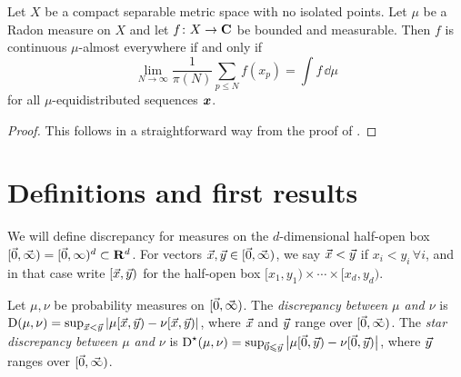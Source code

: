 \begin{theorem}
Let $X$ be a compact separable metric space with no isolated points. Let $\mu$ 
be a Radon measure on $X$ and let $f\colon X\to \mathbf{C}$ be bounded and measurable. 
Then $f$ is continuous $\mu$-almost everywhere if and only if 
\[
	\lim_{N\to \infty} \frac{1}{\pi(N)} \sum_{p\leqslant N} f(x_p) = \int f\, \dd\mu
\]
for all $\mu$-equidistributed sequences ${\boldsymbol x}$. 
\end{theorem}
\begin{proof}
This follows in a straightforward way from the proof of 
\cite[Th.~1]{mazzone-1995}. 
\end{proof}





\section{Definitions and first results}

We will define discrepancy for measures on the $d$-dimensional half-open box 
$[\vec{0},\vec{\infty}) = [\vec{0},\infty)^d\subset \mathbf{R}^d$. For vectors 
$\vec{x},\vec{y}\in [\vec{0},\vec{\infty})$, we say $\vec{x}<\vec{y}$ if $x_i<y_i\,\forall i$, and 
in that case write $[\vec{x},\vec{y})$ for the half-open box 
$[x_1,y_1)\times \cdots \times [x_d,y_d)$. 

\begin{definition}
Let $\mu, \nu$ be probability measures on $[\vec{0},\vec{\infty})$. The 
\emph{discrepancy between $\mu$ and $\nu$} is 
$\operatorname{D}(\mu,\nu) = \sup_{\vec{x} < \vec{y}} \left| \mu[\vec{x},\vec{y}) - \nu[\vec{x},\vec{y})\right|$, 
where $\vec{x}$ and $\vec{y}$ range over $[\vec{0},\vec{\infty})$.
The \emph{star discrepancy between $\mu$ and $\nu$} is 
$\operatorname{D}^\star(\mu,\nu) = \sup_{\vec{0}\leqslant \vec{y}} \left| \mu[\vec{0},\vec{y}) - \nu[\vec{0},\vec{y})\right|$, 
where $\vec{y}$ ranges over $[\vec{0},\vec{\infty})$. 
\end{definition}

